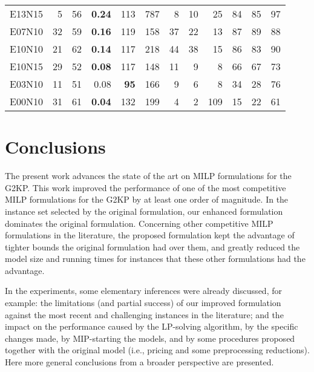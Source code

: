 \documentclass[ppgc,tese,english,formais,babel]{iiufrgs}
\newcommand{\bestcolumnemph}[1]{\textbf{#1}}
\begin{document}
\begin{table}
\begin{center}
\begin{tabular}{lrrrrrrrrrrr}
E13N15 & 5 & 56 & \bestcolumnemph{0.24} & 113 & 787 & 8 & 10 & 25 & 84 & 85 & 97 \\
E07N10 & 32 & 59 & \bestcolumnemph{0.16} & 119 & 158 & 37 & 22 & 13 & 87 & 89 & 88 \\
E10N10 & 21 & 62 & \bestcolumnemph{0.14} & 117 & 218 & 44 & 38 & 15 & 86 & 83 & 90 \\
E10N15 & 29 & 52 & \bestcolumnemph{0.08} & 117 & 148 & 11 & 9 & 8 & 66 & 67 & 73 \\
E03N10 & 11 & 51 & 0.08 & \bestcolumnemph{95} & 166 & 9 & 6 & 8 & 34 & 28 & 76 \\
E00N10 & 31 & 61 & \bestcolumnemph{0.04} & 132 & 199 & 4 & 2 & 109 & 15 & 22 & 61 \\\hline\hline
\end{tabular}
\end{center}
\end{table}

\chapter{Conclusions}
\label{sec:conclusions}

The present work advances the state of the art on MILP formulations for the G2KP.
This work improved the performance of one of the most competitive MILP formulations for the G2KP by at least one order of magnitude.
In the instance set selected by the original formulation, our enhanced formulation dominates the original formulation.
Concerning other competitive MILP formulations in the literature, the proposed formulation kept the advantage of tighter bounds the original formulation had over them, and greatly reduced the model size and running times for instances that these other formulations had the advantage.

In the experiments, some elementary inferences were already discussed, for example: the limitations (and partial success) of our improved formulation against the most recent and challenging instances in the literature; and the impact on the performance caused by the LP-solving algorithm, by the specific changes made, by MIP-starting the models, and by some procedures proposed together with the original model (i.e., pricing and some preprocessing reductions).
Here more general conclusions from a broader perspective are presented.
\end{document}
